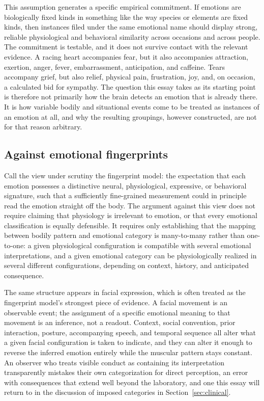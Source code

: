 \documentclass[11pt]{article}
\begin{document}
This assumption generates a specific empirical commitment. If emotions are biologically fixed kinds in something like the way species or elements are fixed kinds, then instances filed under the same emotional name should display strong, reliable physiological and behavioral similarity across occasions and across people. The commitment is testable, and it does not survive contact with the relevant evidence. A racing heart accompanies fear, but it also accompanies attraction, exertion, anger, fever, embarrassment, anticipation, and caffeine. Tears accompany grief, but also relief, physical pain, frustration, joy, and, on occasion, a calculated bid for sympathy. The question this essay takes as its starting point is therefore not primarily how the brain detects an emotion that is already there. It is how variable bodily and situational events come to be treated as instances of an emotion at all, and why the resulting groupings, however constructed, are not for that reason arbitrary.

\subsection{Against emotional fingerprints}

Call the view under scrutiny the fingerprint model: the expectation that each emotion possesses a distinctive neural, physiological, expressive, or behavioral signature, such that a sufficiently fine-grained measurement could in principle read the emotion straight off the body. The argument against this view does not require claiming that physiology is irrelevant to emotion, or that every emotional classification is equally defensible. It requires only establishing that the mapping between bodily pattern and emotional category is many-to-many rather than one-to-one: a given physiological configuration is compatible with several emotional interpretations, and a given emotional category can be physiologically realized in several different configurations, depending on context, history, and anticipated consequence.

The same structure appears in facial expression, which is often treated as the fingerprint model's strongest piece of evidence. A facial movement is an observable event; the assignment of a specific emotional meaning to that movement is an inference, not a readout. Context, social convention, prior interaction, posture, accompanying speech, and temporal sequence all alter what a given facial configuration is taken to indicate, and they can alter it enough to reverse the inferred emotion entirely while the muscular pattern stays constant. An observer who treats visible conduct as containing its interpretation transparently mistakes their own categorization for direct perception, an error with consequences that extend well beyond the laboratory, and one this essay will return to in the discussion of imposed categories in Section~\ref{sec:clinical}.
\end{document}
